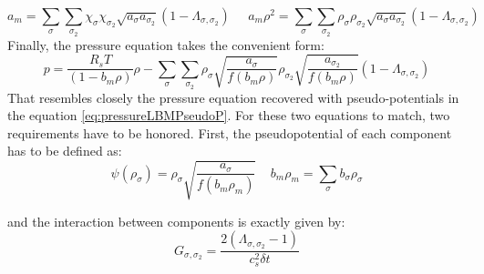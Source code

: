 \documentclass{article}
\begin{document}
	\begin{equation*}
		a_m = \sum_\sigma \sum_{\sigma_2} \chi_\sigma \chi_{\sigma_2} \sqrt{a_\sigma a_{\sigma_2}} (1-\varLambda_{\sigma, \sigma_2}) \; \; \; \; \; a_m \rho^2 = \sum_\sigma \sum_{\sigma_2} \rho_\sigma  \rho_{\sigma_2} \sqrt{a_\sigma a_{\sigma_2}} (1-\varLambda_{\sigma, \sigma_2})
	\end{equation*}
	Finally, the pressure equation takes the convenient form:
	\begin{equation}
		p = \frac{R_sT}{(1-b_m \rho)} \rho - \sum_\sigma \sum_{\sigma_2} \rho_\sigma  \sqrt{\frac{a_\sigma}{f(b_m \rho)} } \rho_{\sigma_2} \sqrt{\frac{a_{\sigma_2}}{f(b_m \rho)} }   (1-\varLambda_{\sigma, \sigma_2})
	\end{equation}
	That resembles closely the pressure equation recovered with pseudo-potentials in the equation \ref{eq:pressureLBMPseudoP}. For these two equations to match, two requirements have to be honored. First, the pseudopotential of each component has to be defined as:
	\begin{equation}\label{eq:newPseudopotential}
		\psi(\rho_\sigma) = \rho_\sigma \sqrt{\frac{a_\sigma}{f(b_m \rho_m)}} \; \; \; \; b_m \rho_m = \sum_\sigma b_\sigma \rho_\sigma
	\end{equation}
	
	and the interaction between components is exactly given by:
	\begin{equation*}
		G_{\sigma,\sigma_2} = \frac{2(\varLambda_{\sigma, \sigma_2}-1)}{c_s^2 \delta t} 
	\end{equation*}
	
\end{document}
